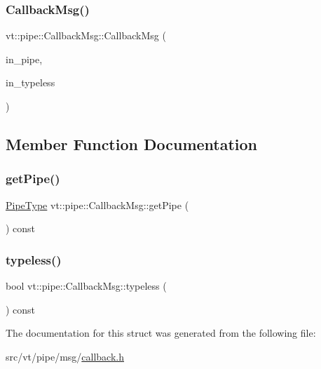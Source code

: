 \subsubsection{\texorpdfstring{Callback\+Msg()}{CallbackMsg()}\hspace{0.1cm}{\footnotesize\ttfamily [3/3]}}
{\footnotesize\ttfamily vt\+::pipe\+::\+Callback\+Msg\+::\+Callback\+Msg (\begin{DoxyParamCaption}\item[{\hyperlink{namespacevt_ac9852acda74d1896f48f406cd72c7bd3}{Pipe\+Type} const \&}]{in\+\_\+pipe,  }\item[{bool const \&}]{in\+\_\+typeless }\end{DoxyParamCaption})\hspace{0.3cm}{\ttfamily [inline]}}



\subsection{Member Function Documentation}
\mbox{\label{structvt_1_1pipe_1_1_callback_msg_aeddb711b3d197e766b384692246ed4a5}} 
\subsubsection{\texorpdfstring{get\+Pipe()}{getPipe()}}
{\footnotesize\ttfamily \hyperlink{namespacevt_ac9852acda74d1896f48f406cd72c7bd3}{Pipe\+Type} vt\+::pipe\+::\+Callback\+Msg\+::get\+Pipe (\begin{DoxyParamCaption}{ }\end{DoxyParamCaption}) const\hspace{0.3cm}{\ttfamily [inline]}}

\mbox{\label{structvt_1_1pipe_1_1_callback_msg_ae7c7bf7e1998626719e0dd08ddfc8738}} 
\subsubsection{\texorpdfstring{typeless()}{typeless()}}
{\footnotesize\ttfamily bool vt\+::pipe\+::\+Callback\+Msg\+::typeless (\begin{DoxyParamCaption}{ }\end{DoxyParamCaption}) const\hspace{0.3cm}{\ttfamily [inline]}}



The documentation for this struct was generated from the following file\+:\begin{DoxyCompactItemize}
\item 
src/vt/pipe/msg/\hyperlink{callback_8h}{callback.\+h}\end{DoxyCompactItemize}
